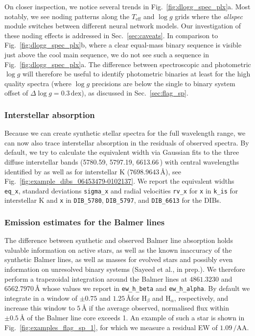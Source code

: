 \documentclass[
  journal=pasa,
  manuscript=research-paper, %
  year=2023,
  volume=37
]{cup-journal}
\newcommand{\Teff}{$T_\mathrm{eff}$\xspace}
\newcommand{\logg}{$\log g$\xspace}
\newcommand{\Angstroem}{\,\text{\AA}}	%
\begin{document}
On closer inspection, we notice several trends in Fig.~\ref{fig:dlogg_spec_plx}a. Most notably, we see noding patterns along the \Teff and \logg grids where the \textit{allspec} module switches between different neural network models. Our investigation of these noding effects is addressed in Sec.~\ref{sec:caveats}. In comparison to Fig.~\ref{fig:dlogg_spec_plx}b, where a clear equal-mass binary sequence is visible just above the cool main sequence, we do not see such a sequence in Fig.~\ref{fig:dlogg_spec_plx}a. The difference between spectroscopic and photometric \logg will therefore be useful to identify photometric binaries at least for the high quality spectra (where \logg precisions are below the single to binary system offset of $\Delta \log g = 0.3\,\mathrm{dex}$), as discussed in Sec.~\ref{sec:flag_sp}.

\subsubsection{Interstellar absorption}

Because we can create synthetic stellar spectra for the full wavelength range, we can now also trace interstellar absorption in the residuals of observed spectra. By default, we try to calculate the equivalent width via Gaussian fits to the three diffuse interstellar bands (5780.59, 5797.19, 6613.66\Angstroem) with central wavelengths identified by \citet{Vogrincic2023} as well as for interstellar K ($7698.9643\,\text{\AA}$), see Fig.~\ref{fig:example_dibs_06453479-0102137}. We report the equivalent widths \texttt{eq\_x}, standard deviations \texttt{sigma\_x} and radial velocities \texttt{rv\_x} for \texttt{x} in \texttt{k\_is} for interstellar K and \texttt{x} in \texttt{DIB\_5780}, \texttt{DIB\_5797}, and \texttt{DIB\_6613} for the DIBs.

\subsubsection{Emission estimates for the Balmer lines}

The difference between synthetic and observed Balmer line absorption holds valuable information on active stars, as well as the known inaccuracy of the synthetic Balmer lines, as well as masses for evolved stars \citep{Bergemann2016} and possibly even information on unresolved binary systems (Sayeed et al., in prep.). We therefore perform a trapezoidal integration around the Balmer lines at $4861.3230$ and $6562.7970\,\text{\AA}$ whose values we report in \texttt{ew\_h\_beta} and \texttt{ew\_h\_alpha}. By default we integrate in a window of $\pm 0.75$ and $1.25\,\text{\AA}$for $\text{H}_\beta$ and $\text{H}_\alpha$, respectively, and increase this window to $5\,\text{\AA}$ if the average observed, normalised flux within $\pm 0.5\,\text{\AA}$ of the Balmer line core exceeds 1. An example of such a star is shown in Fig.~\ref{fig:examples_flag_sp_1}, for which we measure a residual EW of $1.09\,\text{/AA}$.
\end{document}
